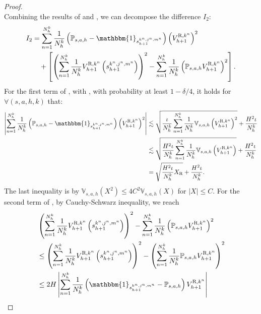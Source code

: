 \documentclass{article}
\newcommand{\R}{\textnormal{R}}
\begin{document}
\begin{proof}
\begin{equation}
    \end{equation}
    Combining the results of  and , we can decompose the difference $I_2$:
    \begin{align}
        \label{i2middle}
        I_2 &= \sum_{n = 1}^{N_h^k}\frac{1}{N_h^k} \left( \mathbb{P}_{s,a,h} - \mathbbm{1}_{s_{h+1}^{k^n,j^n,m^n}}\right)\left(V_{h+1}^{\R,k^n}\right)^2 \nonumber\\
        &\quad +\left[\left(\sum_{n=1}^{N_h^k}\frac{1}{N_h^k}V_{h+1}^{\R,k^n}\left(s_{h+1}^{k^n,j^n,m^n}\right)\right)^2- \sum_{n= 1}^{N_h^k}\frac{1}{N_h^k}\left(\mathbb{P}_{s,a,h} V_{h+1}^{\R,k^n} \right)^2\right]  .
    \end{align}
    For the first term of , with , with probability at least $1-\delta/4$, it holds for $\forall (s,a,h,k)$ that:
    \begin{align}
        \label{i21}
        \left|\sum_{ n = 1}^{N_h^k}\frac{1}{N_h^k} \left( \mathbb{P}_{s,a,h} - \mathbbm{1}_{s_{h+1}^{k^n,j^n,m^n}}\right)\left(V_{h+1}^{\R,k^n} \right)^2\right| &\lesssim \sqrt{\frac{\iota}{N_h^k} \sum_{n=1}^{N_h^k} \frac{1}{N_h^k} \mathbb{V}_{s,a,h}\left(V_{h+1}^{\R,k^n} \right)^2} + \frac{H^2\iota}{N_h^k}\nonumber\\
        &\lesssim \sqrt{\frac{H^2\iota}{N_h^k}\sum_{n= 1}^{N_h^k}\frac{1}{N_h^k} \mathbb{V}_{s,a,h}\left(V_{h+1}^{\R,k^n}\right)} + \frac{H^2\iota}{N_h^k} \nonumber\\
        & = \sqrt{\frac{H^2\iota}{N_h^k}X_{\R}} + \frac{H^2\iota}{N_h^k}.
    \end{align}
    The last inequality is by $\mathbb{V}_{s,a,h}(X^2) \leq 4C^2\mathbb{V}_{s,a,h}(X)$ for $|X| \leq C$.
    For the second term of , by Cauchy-Schwarz inequality, we reach
    \begin{align}
        \label{i22}
        &\left(\sum_{n=1}^{N_h^k}\frac{1}{N_h^k}V_{h+1}^{\R,k^n}\left(s_{h+1}^{k^n,j^n,m^n}\right)\right)^2 - \sum_{n= 1}^{N_h^k}\frac{1}{N_h^k}\left(\mathbb{P}_{s,a,h} V_{h+1}^{\R,k^n} \right)^2 \nonumber\\
        & \leq \left(\sum_{n=1}^{N_h^k}\frac{1}{N_h^k}V_{h+1}^{\R,k^n}\left(s_{h+1}^{k^n,j^n,m^n}\right)\right)^2 - \left(\sum_{n=1}^{N_h^k}\frac{1}{N_h^k}\mathbb{P}_{s,a,h}V_{h+1}^{\R,k^n}\right)^2 \nonumber\\
        & \leq 2H\left|\sum_{n= 1}^{N_h^k}\frac{1}{N_h^k} \left( \mathbbm{1}_{s_{h+1}^{k^n,j^n,m^n}}-\mathbb{P}_{s,a,h}\right)V_{h+1}^{\R,k^n} \right| \nonumber\\

\end{align}
\end{proof}
\end{document}
